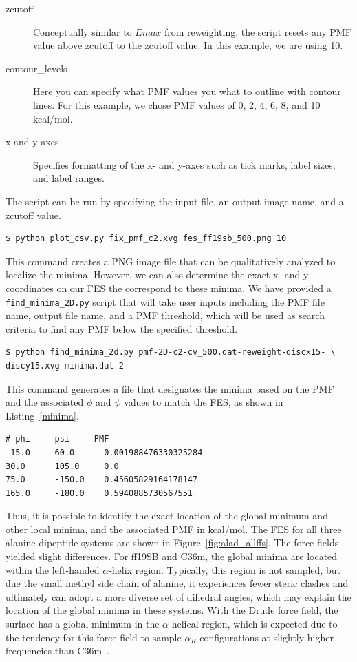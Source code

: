 \documentclass[9pt,tutorial]{livecoms}
\begin{document}
\begin{description}
    \item[zcutoff] Conceptually similar to $Emax$ from reweighting, the script resets any PMF value above zcutoff to the zcutoff value. In this example, we are using 10.
    \item[contour\_levels] Here you can specify what PMF values you what to outline with contour lines. For this example, we chose PMF values of 0, 2, 4, 6, 8, and 10 kcal/mol.
    \item[x and y axes] Specifies formatting of the x- and y-axes such as tick marks, label sizes, and label ranges.
\end{description}

The script can be run by specifying the input file, an output image name, and a zcutoff value. 

\begin{lstlisting}[style=MyBash]
$ python plot_csv.py fix_pmf_c2.xvg fes_ff19sb_500.png 10
\end{lstlisting}

This command creates a PNG image file that can be qualitatively analyzed to localize the minima. However, we can also determine the exact x- and y-coordinates on our FES the correspond to these minima. We have provided a \texttt{find\_minima\_2D.py} script that will take user inputs including the PMF file name, output file name, and a PMF threshold, which will be used as search criteria to find any PMF below the specified threshold.

\begin{lstlisting}[style=MyBash]
$ python find_minima_2d.py pmf-2D-c2-cv_500.dat-reweight-discx15- \
discy15.xvg minima.dat 2
\end{lstlisting}

This command generates a file that designates the minima based on the PMF and the associated $\phi$ and $\psi$ values to match the FES, as shown in Listing~\ref{minima}. 

\begin{lstlisting}[label=minima, caption=minima.dat, basicstyle=\small, backgroundcolor=\color{light-gray}]
# phi     psi     PMF 
-15.0     60.0      0.001988476330325284
30.0      105.0     0.0
75.0      -150.0    0.45605829164178147
165.0     -180.0    0.5940885730567551
\end{lstlisting}

Thus, it is possible to identify the exact location of the global minimum and other local minima, and the associated PMF in kcal/mol. The FES for all three alanine dipeptide systems are shown in Figure~\ref{fig:alad_allffs}. The force fields yielded slight differences. For ff19SB and C36m, the global minima are located within the left-handed $\alpha$-helix region. Typically, this region is not sampled, but due the small methyl side chain of alanine, it experiences fewer steric clashes and ultimately can adopt a more diverse set of dihedral angles, which may explain the location of the global minima in these systems. With the Drude force field, the surface has a global minimum in the $\alpha$-helical region, which is expected due to the tendency for this force field to sample $\alpha_R$ configurations at slightly higher frequencies than C36m~\cite{lin_further_2020}.
\end{document}
